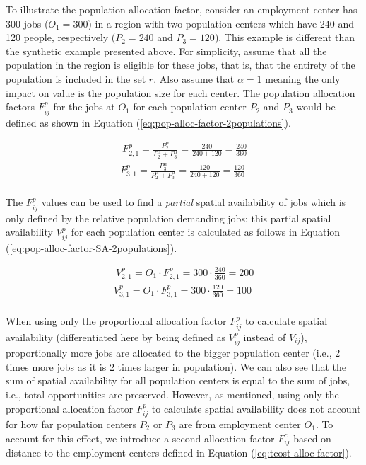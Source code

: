 \documentclass[]{elsarticle} %
\begin{document}
To illustrate the population allocation factor, consider an employment
center has 300 jobs (\(O_1= 300\)) in a region with two population
centers which have 240 and 120 people, respectively (\(P_2= 240\) and
\(P_3 = 120\)). This example is different than the synthetic example
presented above. For simplicity, assume that all the population in the
region is eligible for these jobs, that is, that the entirety of the
population is included in the set \(r\). Also assume that \(\alpha=1\)
meaning the only impact on value is the population size for each center.
The population allocation factors \(F^p_{ij}\) for the jobs at \(O_1\)
for each population center \(P_2\) and \(P_3\) would be defined as shown
in Equation (\ref{eq:pop-alloc-factor-2populations}).

\begin{equation}
\label{eq:pop-alloc-factor-2populations}
\begin{array}{l}\
F^p_{2,1} = \frac{P_2 ^\alpha}{P_2^\alpha + P_3^\alpha} = \frac{240}{240 + 120} = \frac{240}{360}\\
F^p_{3,1} = \frac{P_3^\alpha}{P_2^\alpha + P_3^\alpha}  = \frac{120}{240 + 120} = \frac{120}{360}\\
\end{array}
\end{equation}

The \(F^p_{ij}\) values can be used to find a \emph{partial} spatial
availability of jobs which is only defined by the relative population
demanding jobs; this partial spatial availability \(V^p_{ij}\) for each
population center is calculated as follows in Equation
(\ref{eq:pop-alloc-factor-SA-2populations}).

\begin{equation}
\label{eq:pop-alloc-factor-SA-2populations}
\begin{array}{l}\
V^p_{2,1} = O_1 \cdot F^p_{2,1} = 300 \cdot \frac{240}{360} = 200 \\
V^p_{3,1} = O_1 \cdot F^p_{3,1} = 300 \cdot \frac{120}{360} = 100 \\
\end{array}
\end{equation}

When using only the proportional allocation factor \(F^p_{ij}\) to
calculate spatial availability (differentiated here by being defined as
\(V^p_{ij}\) instead of \(V_{ij}\)), proportionally more jobs are
allocated to the bigger population center (i.e., 2 times more jobs as it
is 2 times larger in population). We can also see that the sum of
spatial availability for all population centers is equal to the sum of
jobs, i.e., total opportunities are preserved. However, as mentioned,
using only the proportional allocation factor \(F^p_{ij}\) to calculate
spatial availability does not account for how far population centers
\(P_2\) or \(P_3\) are from employment center \(O_1\). To account for
this effect, we introduce a second allocation factor \(F^c_{ij}\) based
on distance to the employment centers defined in Equation
(\ref{eq:tcost-alloc-factor}).
\end{document}
